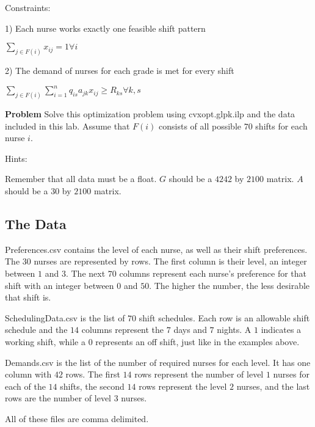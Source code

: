 Constraints:

1) Each nurse works exactly one feasible shift pattern
\begin{center}
$\displaystyle\sum_{j\in F(i)} x_{ij} = 1 \forall i$
\end{center}

2) The demand of nurses for each grade is met for every shift
\begin{center}
$\displaystyle\sum_{j\in F(i)} \displaystyle\sum_{i=1}^n q_{is}a_{jk}x_{ij} \geq R_{ks} \forall k,s$
\end{center}


\textbf{Problem}
Solve this optimization problem using cvxopt.glpk.ilp and the data included in this lab.
Assume that $F(i)$ consists of all possible $70$ shifts for each nurse $i$. 

Hints: 

Remember that all data must be a float. 
$G$ should be a $4242$ by $2100$ matrix.
$A$ should be a $30$ by $2100$ matrix.


\subsection*{The Data}
Preferences.csv contains the level of each nurse, as well as their shift preferences. The $30$ nurses are represented by rows. The first column is their level, an integer between $1$ and $3$. The next $70$ columns represent each nurse's preference for that shift with an integer between $0$ and $50$. The higher the number, the less desirable that shift is. 

SchedulingData.csv is the list of $70$ shift schedules. Each row is an allowable shift schedule and the $14$ columns represent the $7$ days and $7$ nights.  A $1$ indicates a working shift, while a $0$ represents an off shift, just like in the examples above.

Demands.csv is the list of the number of required nurses for each level. It has one column with $42$ rows. The first $14$ rows represent the number of level $1$ nurses for each of the $14$ shifts, the second $14$ rows represent the level $2$ nurses, and the last rows are the number of level $3$ nurses. 

All of these files are comma delimited.





